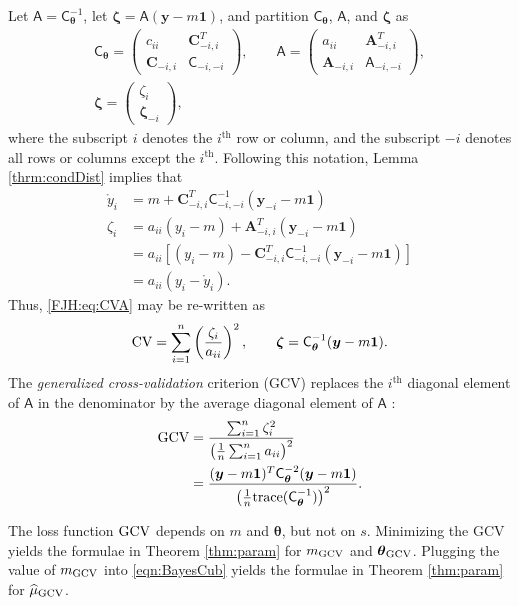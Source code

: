 \documentclass[twocolumn]{svjour3}          %
\newcommand{\bm}[1]{\boldsymbol{#1}}
\newcommand{\trace}[1]{\textup{trace}{#1}}
\newcommand{\vtheta}{{\bm{\theta}}}
\newcommand{\vzeta}{{\bm{\zeta}}}
\newcommand{\vA}{\bm{A}}
\newcommand{\vC}{\bm{C}}
\newcommand{\vy}{\bm{y}}
\newcommand{\vone}{\bm{1}}
\newcommand{\mA}{\mathsf{A}}
\newcommand{\mC}{\mathsf{C}}
\newcommand{\GCV}{\textup{GCV}}
\begin{document}
Let $\mA = \mC^{-1}_\vtheta$, let $\vzeta = \mA (\vy - m \vone)$, and partition $\mC_\vtheta$, $\mA$, and $\vzeta$ as
\begin{gather*}
\mC_\vtheta = \begin{pmatrix} c_{ii}  & \vC_{-i,i}^T \\  \vC_{-i,i} & \mC_{-i,-i}\end{pmatrix}, \qquad
\mA = \begin{pmatrix} a_{ii}  & \vA_{-i,i}^T \\  \vA_{-i,i} & \mA_{-i,-i}\end{pmatrix}, \\ \vzeta = \begin{pmatrix} \zeta_i   \\  \vzeta_{-i} \end{pmatrix},
\end{gather*}
where the subscript $i$ denotes the $i^{\text{th}}$ row or column, and the subscript $-i$ denotes all rows or columns except the $i^{\text{th}}$. Following this notation, Lemma \ref{thrm:condDist} implies that 
\begin{align*}
\mathring{y}_i & = m + \vC^T_{-i,i} \mC_{-i,-i}^{-1} (\vy_{-i} -m \vone)  \\
\zeta_i  & = a_{ii}(y_i - m) + \vA_{-i,i}^T(\vy_{-i} - m \vone) \\
& = a_{ii}[(y_i - m) - \vC^T_{-i,i} \mC_{-i,-i}^{-1} (\vy_{-i} -m \vone)] \\
& = a_{ii}(y_i - \mathring{y}_i).
\end{align*}
Thus, \eqref{FJH:eq:CVA} may be re-written as 
\begin{align*} %
\textup{CV} = \sum_{i=1}^n \left(\frac{\zeta_i}{a_{ii}} \right)^2, \qquad \vzeta = \mC^{-1}_\vtheta(\vy - m \vone).
\end{align*}
The \emph{generalized cross-validation} criterion (GCV) replaces the $i^{\text{th}}$ diagonal element of $\mA$ in the denominator by the average diagonal element of $\mA$ \cite{CraWah79a,GolHeaWah79a,Wah90}:
\begin{align*} 
\textup{GCV} &
= \frac{\sum_{i=1}^n\zeta_i^2}{\left(\frac 1n \sum_{i=1}^n a_{ii} \right)^2} \\
& = \frac{(\vy - m\vone)^T \mC^{-2}_\vtheta (\vy - m \vone)}{\left(\frac 1n \trace(\mC_\vtheta^{-1}) \right)^2}.
\end{align*}

The loss function $\textup{GCV}$ depends on $m$ and $\vtheta$, but not on $s$.  Minimizing the GCV  yields the formulae in Theorem \ref{thm:param} for $m_{\textup{GCV}}$ and $\vtheta_{\textup{GCV}}$.  
Plugging the value of $m_\GCV$ into \eqref{eqn:BayesCub} yields the formulae in Theorem \ref{thm:param} for $\widehat{\mu}_{\textup{GCV}}$.
\end{document}
